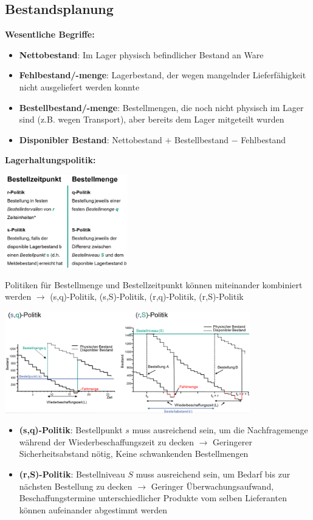 \subsection{Bestandsplanung}

\textbf{Wesentliche Begriffe:}
\begin{itemize}
	\item \textbf{Nettobestand}: Im Lager physisch befindlicher Bestand an Ware
	\item \textbf{Fehlbestand/-menge}: Lagerbestand, der wegen mangelnder Lieferfähigkeit nicht ausgeliefert werden konnte
	\item \textbf{Bestellbestand/-menge}: Bestellmengen, die noch nicht physisch im Lager sind (z.B. wegen Transport), aber bereits dem Lager mitgeteilt wurden 
	\item \textbf{Disponibler Bestand}: Nettobestand $+$ Bestellbestand $-$ Fehlbestand
\end{itemize}
\bigskip
\textbf{Lagerhaltungspolitik:}
\begin{center}
	\includegraphics[width=0.4\textwidth]{images/lagerhaltungspolitik.png}
\end{center}
Politiken für Bestellmenge und Bestellzeitpunkt können miteinander kombiniert werden $\rightarrow$ (s,q)-Politik, (s,S)-Politik, (r,q)-Politik, (r,S)-Politik
\begin{center}
	\includegraphics[width=0.8\textwidth]{images/sq-rs.png}
\end{center}
\begin{itemize}
	\item \textbf{(s,q)-Politik}: Bestellpunkt $s$ muss ausreichend sein, um die Nachfragemenge während der Wiederbeschaffungszeit zu decken
	$\rightarrow$ Geringerer Sicherheitsabstand nötig, Keine schwankenden Bestellmengen 
	\item \textbf{(r,S)-Politik}: Bestellniveau $S$ muss ausreichend sein, um Bedarf bis zur nächsten Bestellung zu decken $\rightarrow$ Geringer Überwachungsaufwand, Beschaffungstermine unterschiedlicher Produkte vom selben Lieferanten können aufeinander abgestimmt werden
\end{itemize}

